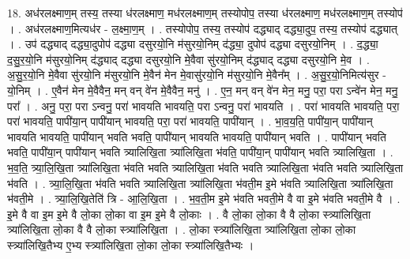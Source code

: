 \documentclass[17pt]{extarticle}
\begin{document}
18. अध॑रलक्ष्माण॒म् तस्य॒ तस्या ध॑रलक्ष्माण॒ मध॑रलक्ष्माण॒म् तस्योपोप॒ तस्या ध॑रलक्ष्माण॒ मध॑रलक्ष्माण॒म् तस्योप॑ । . अध॑रलक्ष्माण॒मित्यध॑र - ल॒क्ष्मा॒ण॒म् । . तस्योपोप॒ तस्य॒ तस्योप॑ दद्ध्याद् दद्ध्या॒दुप॒ तस्य॒ तस्योप॑ दद्ध्यात् । . उप॑ दद्ध्याद् दद्ध्या॒दुपोप॑ दद्ध्या दसुरयो॒नि म॑सुरयो॒निम् द॑द्ध्या॒ दुपोप॑ दद्ध्या दसुरयो॒निम् । . द॒द्ध्या॒ द॒सु॒र॒यो॒नि म॑सुरयो॒निम् द॑द्ध्याद् दद्ध्या दसुरयो॒नि मे॒वैवा सु॑रयो॒निम् द॑द्ध्याद् दद्ध्या दसुरयो॒नि मे॒व । . अ॒सु॒र॒यो॒नि मे॒वैवा सु॑रयो॒नि म॑सुरयो॒नि मे॒वैन॑ मेन मे॒वासु॑रयो॒नि म॑सुरयो॒नि मे॒वैन᳚म् । . अ॒सु॒र॒यो॒निमित्य॑सुर - यो॒निम् । . ए॒वैन॑ मेन मे॒वैवैन॒ मन् वन् वे॑न मे॒वैवैन॒ मनु॑ । . ए॒न॒ मन् वन् वे॑न मेन॒ मनु॒ परा॒ परा ऽन्वे॑न मेन॒ मनु॒ परा᳚ । . अनु॒ परा॒ परा ऽन्वनु॒ परा॑ भावयति भावयति॒ परा ऽन्वनु॒ परा॑ भावयति । . परा॑ भावयति भावयति॒ परा॒ परा॑ भावयति॒ पापी॑या॒न् पापी॑यान् भावयति॒ परा॒ परा॑ भावयति॒ पापी॑यान् । . भा॒व॒य॒ति॒ पापी॑या॒न् पापी॑यान् भावयति भावयति॒ पापी॑यान् भवति भवति॒ पापी॑यान् भावयति भावयति॒ पापी॑यान् भवति । . पापी॑यान् भवति भवति॒ पापी॑या॒न् पापी॑यान् भवति त्र्यालिखि॒ता त्र्या॑लिखि॒ता भ॑वति॒ पापी॑या॒न् पापी॑यान् भवति त्र्यालिखि॒ता । . भ॒व॒ति॒ त्र्या॒लि॒खि॒ता त्र्या॑लिखि॒ता भ॑वति भवति त्र्यालिखि॒ता भ॑वति भवति त्र्यालिखि॒ता भ॑वति भवति त्र्यालिखि॒ता भ॑वति । . त्र्या॒लि॒खि॒ता भ॑वति भवति त्र्यालिखि॒ता त्र्या॑लिखि॒ता भ॑वती॒म इ॒मे भ॑वति त्र्यालिखि॒ता त्र्या॑लिखि॒ता भ॑वती॒मे । . त्र्या॒लि॒खि॒तेति॑ त्रि - आ॒लि॒खि॒ता । . भ॒व॒ती॒म इ॒मे भ॑वति भवती॒मे वै वा इ॒मे भ॑वति भवती॒मे वै । . इ॒मे वै वा इ॒म इ॒मे वै लो॒का लो॒का वा इ॒म इ॒मे वै लो॒काः । . वै लो॒का लो॒का वै वै लो॒का स्त्र्या॑लिखि॒ता त्र्या॑लिखि॒ता लो॒का वै वै लो॒का स्त्र्या॑लिखि॒ता । . लो॒का स्त्र्या॑लिखि॒ता त्र्या॑लिखि॒ता लो॒का लो॒का स्त्र्या॑लिखि॒तैभ्य ए॒भ्य स्त्र्या॑लिखि॒ता लो॒का लो॒का स्त्र्या॑लिखि॒तैभ्यः । \newline
\end{document}
